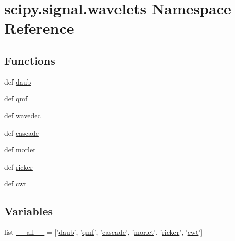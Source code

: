 \hypertarget{namespacescipy_1_1signal_1_1wavelets}{}\section{scipy.\+signal.\+wavelets Namespace Reference}
\label{namespacescipy_1_1signal_1_1wavelets}
\subsection*{Functions}
\begin{DoxyCompactItemize}
\item 
def \hyperlink{namespacescipy_1_1signal_1_1wavelets_a05cf41f6148c2ddaaade87f5827183c3}{daub}
\item 
def \hyperlink{namespacescipy_1_1signal_1_1wavelets_aa31d919743a7beac5ef0726b4953c884}{qmf}
\item 
def \hyperlink{namespacescipy_1_1signal_1_1wavelets_af0ab4a818f84ee35cc2569aeffa825cb}{wavedec}
\item 
def \hyperlink{namespacescipy_1_1signal_1_1wavelets_a9890c1838250738ea99cf371bf3b8b46}{cascade}
\item 
def \hyperlink{namespacescipy_1_1signal_1_1wavelets_adbc01283b069f009d11a3ff978da8868}{morlet}
\item 
def \hyperlink{namespacescipy_1_1signal_1_1wavelets_a714bd12602ed95b5dbcae2f3c02294e3}{ricker}
\item 
def \hyperlink{namespacescipy_1_1signal_1_1wavelets_a3f22d14053a780fac0c7ad142dea0ba2}{cwt}
\end{DoxyCompactItemize}
\subsection*{Variables}
\begin{DoxyCompactItemize}
\item 
list \hyperlink{namespacescipy_1_1signal_1_1wavelets_a65471d3ba656ddad4df13a8113c5d0d9}{\+\_\+\+\_\+all\+\_\+\+\_\+} = \mbox{[}'\hyperlink{namespacescipy_1_1signal_1_1wavelets_a05cf41f6148c2ddaaade87f5827183c3}{daub}', '\hyperlink{namespacescipy_1_1signal_1_1wavelets_aa31d919743a7beac5ef0726b4953c884}{qmf}', '\hyperlink{namespacescipy_1_1signal_1_1wavelets_a9890c1838250738ea99cf371bf3b8b46}{cascade}', '\hyperlink{namespacescipy_1_1signal_1_1wavelets_adbc01283b069f009d11a3ff978da8868}{morlet}', '\hyperlink{namespacescipy_1_1signal_1_1wavelets_a714bd12602ed95b5dbcae2f3c02294e3}{ricker}', '\hyperlink{namespacescipy_1_1signal_1_1wavelets_a3f22d14053a780fac0c7ad142dea0ba2}{cwt}'\mbox{]}
\end{DoxyCompactItemize}



